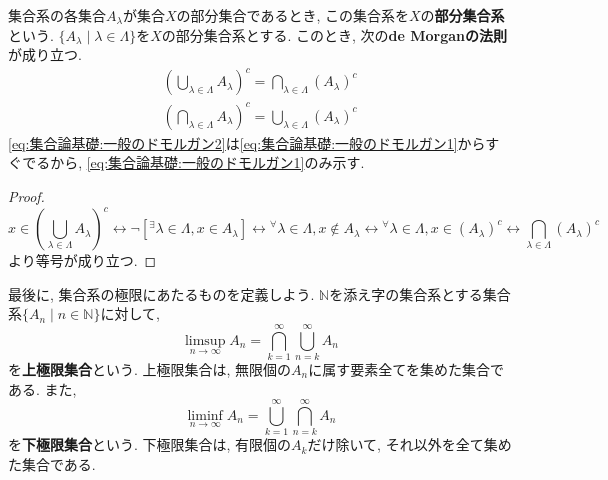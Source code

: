         集合系の各集合$A_\lambda$が集合$X$の部分集合であるとき, この集合系を$X$の\textbf{部分集合系}という. $\{A_\lambda\mid \lambda\in\Lambda\}$を$X$の部分集合系とする.
        このとき, 次の\textbf{de Morganの法則}が成り立つ.
        \begin{align}
            \left(\bigcup_{\lambda\in\Lambda}A_\lambda\right)^c=\bigcap_{\lambda\in\Lambda}(A_\lambda)^c \label{eq:集合論基礎:一般のドモルガン1}\\
            \left(\bigcap_{\lambda\in\Lambda}A_\lambda\right)^c=\bigcup_{\lambda\in\Lambda}(A_\lambda)^c \label{eq:集合論基礎:一般のドモルガン2}
        \end{align}
        \eqref{eq:集合論基礎:一般のドモルガン2}は\eqref{eq:集合論基礎:一般のドモルガン1}からすぐでるから, \eqref{eq:集合論基礎:一般のドモルガン1}のみ示す.
        \begin{proof}
            \begin{equation*}
                x\in \left(\bigcup_{\lambda\in\Lambda}A_\lambda\right)^c \leftrightarrow \lnot [{}^\exists\lambda\in\Lambda,x\in A_\lambda]\leftrightarrow{}^\forall\lambda\in\Lambda,x\not\in A_\lambda\leftrightarrow{}^\forall\lambda\in\Lambda,x\in (A_\lambda)^c\leftrightarrow \bigcap_{\lambda\in\Lambda}(A_\lambda)^c
            \end{equation*}
            より等号が成り立つ.
        \end{proof}
        最後に, 集合系の極限にあたるものを定義しよう. $\mathbb{N}$を添え字の集合系とする集合系$\{A_n\mid n\in\mathbb{N}\}$に対して, 
        \begin{equation}
            \limsup_{n\to\infty}A_n=\bigcap_{k=1}^{\infty}\bigcup_{n=k}^\infty A_n \label{eq:集合論基礎:集合のlimsup}
        \end{equation}
        を\textbf{上極限集合}という. 上極限集合は, 無限個の$A_n$に属す要素全てを集めた集合である. また, 
        \begin{equation}
            \liminf_{n\to\infty}A_n=\bigcup_{k=1}^{\infty}\bigcap_{n=k}^\infty A_n \label{eq:集合論基礎:集合のliminf}
        \end{equation}
        を\textbf{下極限集合}という. 下極限集合は, 有限個の$A_k$だけ除いて, それ以外を全て集めた集合である. 

